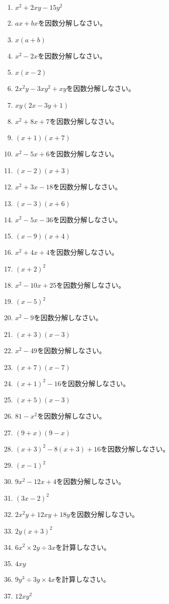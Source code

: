 \documentclass[uplatex,a4j,11pt]{jsreport}
\begin{document}
\begin{multicols}{2}
\begin{enumerate}
    \item $x^2+2xy-15y^2$
    \item $ax+bx$\quad を因数分解しなさい。%
    \item $x(a+b)$
    \item $x^2-2x$\quad を因数分解しなさい。%
    \item $x(x-2)$
    \item $2x^2y-3xy^2+xy$\quad を因数分解しなさい。%
    \item $xy(2x-3y+1)$
    \item $x^2+8x+7$\quad を因数分解しなさい。%
    \item $(x+1)(x+7)$
    \item $x^2-5x+6$\quad を因数分解しなさい。%
    \item $(x-2)(x+3)$
    \item $x^2+3x-18$\quad を因数分解しなさい。%
    \item $(x-3)(x+6)$
    \item $x^2-5x-36$\quad を因数分解しなさい。%
    \item $(x-9)(x+4)$
    \item $x^2+4x+4$\quad を因数分解しなさい。%
    \item $(x+2)^2$
    \item $x^2-10x+25$\quad を因数分解しなさい。%
    \item $(x-5)^2$
    \item $x^2-9$\quad を因数分解しなさい。%
    \item $(x+3)(x-3)$
    \item $x^2-49$\quad を因数分解しなさい。%
    \item $(x+7)(x-7)$
    \item $(x+1)^2-16$\quad を因数分解しなさい。%
    \item $(x+5)(x-3)$
    \item $81-x^2$\quad を因数分解しなさい。%
    \item $(9+x)(9-x)$
    \item $(x+3)^2-8(x+3)+16$\quad を因数分解しなさい。%
    \item $(x-1)^2$
    \item $9x^2-12x+4$\quad を因数分解しなさい。%
    \item $(3x-2)^2$
    \item $2x^2y+12xy+18y$\quad を因数分解しなさい。%
    \item $2y(x+3)^2$
    \item $6x^2\times 2y\div 3x$\quad を計算しなさい。%
    \item $4xy$
    \item $9y^3\div 3y\times 4x$\quad を計算しなさい。%
    \item $12xy^2$



  \end{enumerate}
\newpage
\end{multicols}
\end{document}
